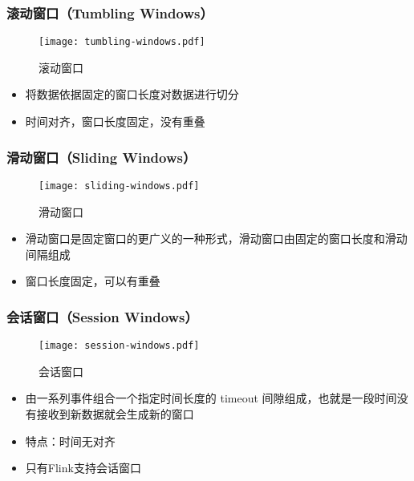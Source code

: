 \documentclass{beamer}
\begin{document}
  \begin{frame}
      \frametitle{滚动窗口（Tumbling Windows）}

      \begin{figure}
        \centering
        \texttt{[image: tumbling-windows.pdf]}
        \caption{滚动窗口}
      \end{figure}
  
      \begin{itemize}
          \item 将数据依据固定的窗口长度对数据进行切分
          \item 时间对齐，窗口长度固定，没有重叠
      \end{itemize}
  
  \end{frame}

  \begin{frame}
      \frametitle{滑动窗口（Sliding Windows）}

      \begin{figure}
        \centering
        \texttt{[image: sliding-windows.pdf]}
        \caption{滑动窗口}
      \end{figure}
  
      \begin{itemize}
          \item 滑动窗口是固定窗口的更广义的一种形式，滑动窗口由固定的窗口长度和滑动间隔组成
          \item 窗口长度固定，可以有重叠
      \end{itemize}
  
  \end{frame}

  \begin{frame}
      \frametitle{会话窗口（Session Windows）}

      \begin{figure}
        \centering
        \texttt{[image: session-windows.pdf]}
        \caption{会话窗口}
      \end{figure}
  
      \begin{itemize}
          \item 由一系列事件组合一个指定时间长度的 timeout 间隙组成，也就是一段时间没有接收到新数据就会生成新的窗口
          \item 特点：时间无对齐
          \item 只有Flink支持会话窗口
      \end{itemize}
  
  \end{frame}
\end{document}
